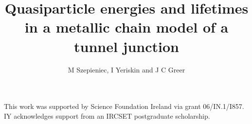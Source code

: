 \documentclass[12pt]{iopart}
\begin{document}
\title{Quasiparticle energies and lifetimes in a metallic chain model of a tunnel junction}
\author{M Szepieniec, I Yeriskin and J C  Greer}
\address{Tyndall National Institute, University College Cork, Cork, Ireland}



\begin{abstract}
	
	\acresetall %
\end{abstract}

\submitto{\NT}

\maketitle



\ack
This work was supported by Science Foundation Ireland via grant 06/IN.1/I857.
IY acknowledges support from an IRCSET postgraduate scholarship. 



\end{document}

